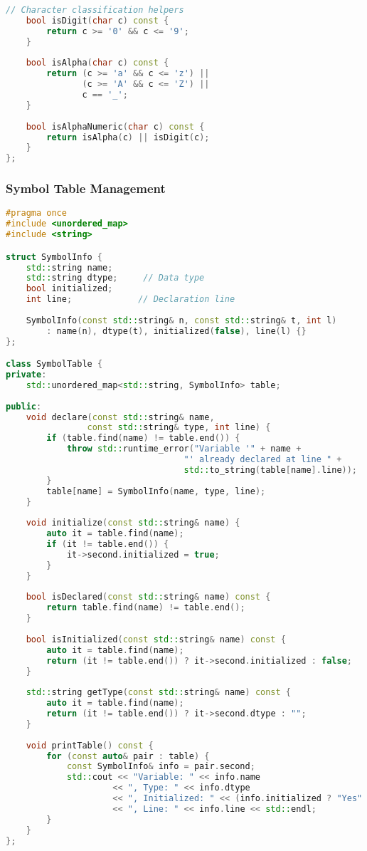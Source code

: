 \documentclass[12pt,a4paper]{article}
\begin{document}
\begin{lstlisting}[language=C++, caption=Lexical Analyzer Implementation]
    // Character classification helpers
    bool isDigit(char c) const { 
        return c >= '0' && c <= '9'; 
    }
    
    bool isAlpha(char c) const { 
        return (c >= 'a' && c <= 'z') || 
               (c >= 'A' && c <= 'Z') || 
               c == '_'; 
    }
    
    bool isAlphaNumeric(char c) const { 
        return isAlpha(c) || isDigit(c); 
    }
};
\end{lstlisting}

\subsubsection{Symbol Table Management}

\begin{lstlisting}[language=C++, caption=Symbol Table Implementation]
#pragma once
#include <unordered_map>
#include <string>

struct SymbolInfo {
    std::string name;
    std::string dtype;     // Data type
    bool initialized;
    int line;             // Declaration line
    
    SymbolInfo(const std::string& n, const std::string& t, int l)
        : name(n), dtype(t), initialized(false), line(l) {}
};

class SymbolTable {
private:
    std::unordered_map<std::string, SymbolInfo> table;
    
public:
    void declare(const std::string& name, 
                const std::string& type, int line) {
        if (table.find(name) != table.end()) {
            throw std::runtime_error("Variable '" + name + 
                                   "' already declared at line " + 
                                   std::to_string(table[name].line));
        }
        table[name] = SymbolInfo(name, type, line);
    }
    
    void initialize(const std::string& name) {
        auto it = table.find(name);
        if (it != table.end()) {
            it->second.initialized = true;
        }
    }
    
    bool isDeclared(const std::string& name) const {
        return table.find(name) != table.end();
    }
    
    bool isInitialized(const std::string& name) const {
        auto it = table.find(name);
        return (it != table.end()) ? it->second.initialized : false;
    }
    
    std::string getType(const std::string& name) const {
        auto it = table.find(name);
        return (it != table.end()) ? it->second.dtype : "";
    }
    
    void printTable() const {
        for (const auto& pair : table) {
            const SymbolInfo& info = pair.second;
            std::cout << "Variable: " << info.name 
                     << ", Type: " << info.dtype
                     << ", Initialized: " << (info.initialized ? "Yes" : "No")
                     << ", Line: " << info.line << std::endl;
        }
    }
};
\end{lstlisting}
\end{document}
